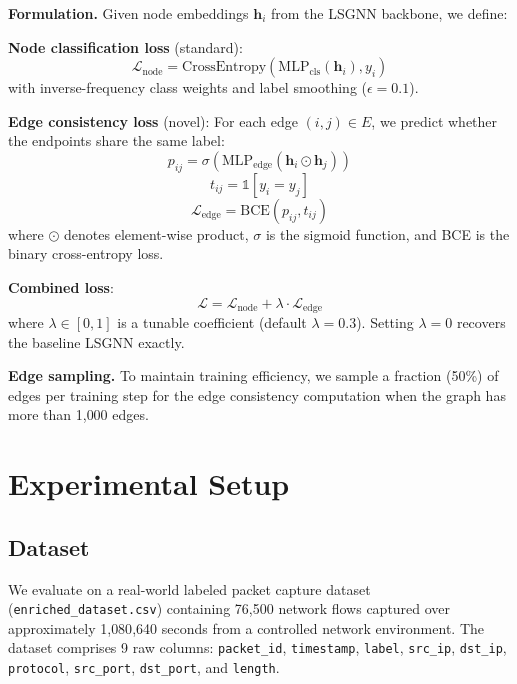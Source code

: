 \documentclass[conference]{IEEEtran}
\begin{document}
\textbf{Formulation.} Given node embeddings $\mathbf{h}_i$ from the LSGNN backbone, we define:

\textbf{Node classification loss} (standard):
\begin{equation}
    \mathcal{L}_{\text{node}} = \text{CrossEntropy}\!\left(\text{MLP}_{\text{cls}}(\mathbf{h}_i), y_i\right)
\end{equation}
with inverse-frequency class weights and label smoothing ($\epsilon = 0.1$).

\textbf{Edge consistency loss} (novel): For each edge $(i, j) \in E$, we predict whether the endpoints share the same label:
\begin{equation}
    p_{ij} = \sigma\!\left(\text{MLP}_{\text{edge}}(\mathbf{h}_i \odot \mathbf{h}_j)\right)
\end{equation}
\begin{equation}
    t_{ij} = \mathbb{1}[y_i = y_j]
\end{equation}
\begin{equation}
    \mathcal{L}_{\text{edge}} = \text{BCE}(p_{ij}, t_{ij})
\end{equation}
where $\odot$ denotes element-wise product, $\sigma$ is the sigmoid function, and BCE is the binary cross-entropy loss.

\textbf{Combined loss}:
\begin{equation}
    \mathcal{L} = \mathcal{L}_{\text{node}} + \lambda \cdot \mathcal{L}_{\text{edge}}
\end{equation}
where $\lambda \in [0, 1]$ is a tunable coefficient (default $\lambda = 0.3$). Setting $\lambda = 0$ recovers the baseline LSGNN exactly.

\textbf{Edge sampling.} To maintain training efficiency, we sample a fraction (50\%) of edges per training step for the edge consistency computation when the graph has more than 1{,}000 edges.

\section{Experimental Setup}

\subsection{Dataset}

We evaluate on a real-world labeled packet capture dataset (\texttt{enriched\_dataset.csv}) containing 76{,}500 network flows captured over approximately 1{,}080{,}640 seconds from a controlled network environment. The dataset comprises 9 raw columns: \texttt{packet\_id}, \texttt{timestamp}, \texttt{label}, \texttt{src\_ip}, \texttt{dst\_ip}, \texttt{protocol}, \texttt{src\_port}, \texttt{dst\_port}, and \texttt{length}.
\end{document}
